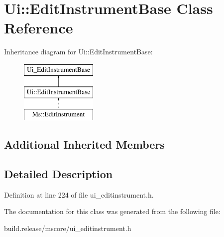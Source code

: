 \hypertarget{class_ui_1_1_edit_instrument_base}{}\section{Ui\+:\+:Edit\+Instrument\+Base Class Reference}
\label{class_ui_1_1_edit_instrument_base}
Inheritance diagram for Ui\+:\+:Edit\+Instrument\+Base\+:\begin{figure}[H]
\begin{center}
\leavevmode
\includegraphics[height=3.000000cm]{class_ui_1_1_edit_instrument_base}
\end{center}
\end{figure}
\subsection*{Additional Inherited Members}


\subsection{Detailed Description}


Definition at line 224 of file ui\+\_\+editinstrument.\+h.



The documentation for this class was generated from the following file\+:\begin{DoxyCompactItemize}
\item 
build.\+release/mscore/ui\+\_\+editinstrument.\+h\end{DoxyCompactItemize}
